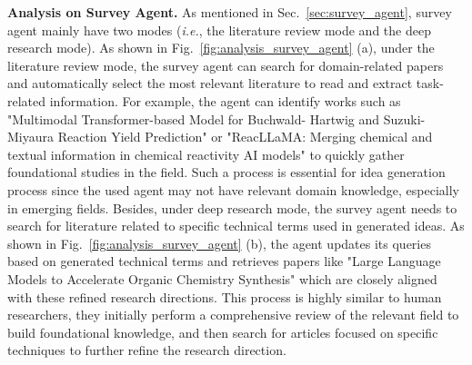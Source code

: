 \textbf{Analysis on Survey Agent.} As mentioned in Sec.~\ref{sec:survey_agent}, survey agent mainly have two modes (\textit{i.e.}, the literature review mode and the deep research mode). As shown in Fig.~\ref{fig:analysis_survey_agent} (a), under the literature review mode, the survey agent can search for domain-related papers and automatically select the most relevant literature to read and extract task-related information. For example, the agent can identify works such as "Multimodal Transformer-based Model for Buchwald-
Hartwig and Suzuki-Miyaura Reaction Yield Prediction" or "ReacLLaMA: Merging chemical and textual
information in chemical reactivity AI models" to quickly gather foundational studies in the field. Such a process is essential for idea generation process since the used agent may not have relevant domain knowledge, especially in emerging fields. Besides, under deep research mode, the survey agent needs to search for literature related to specific technical terms used in generated ideas. As shown in Fig.~\ref{fig:analysis_survey_agent} (b), the agent updates its queries based on generated technical terms and retrieves papers like "Large Language Models to Accelerate Organic Chemistry Synthesis" which are closely aligned with these refined research directions. This process is highly similar to human researchers, they initially perform a comprehensive review of the relevant field to build foundational knowledge, and then search for articles focused on specific techniques to further refine the research direction.



